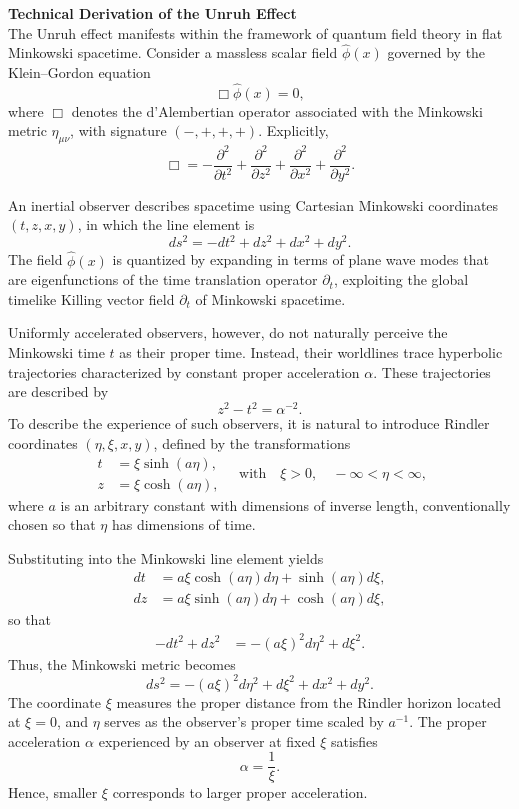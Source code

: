 \begin{technical}
{\Large\textbf{Technical Derivation of the Unruh Effect}}\\[0.7em]

The Unruh effect manifests within the framework of quantum field theory in flat Minkowski spacetime. Consider a massless scalar field $\hat{\phi}(x)$ governed by the Klein--Gordon equation
\[
\Box \hat{\phi}(x) = 0,
\]
where $\Box$ denotes the d'Alembertian operator associated with the Minkowski metric $\eta_{\mu\nu}$, with signature $(-,+,+,+)$. Explicitly,
\[
\Box = -\frac{\partial^2}{\partial t^2} + \frac{\partial^2}{\partial z^2} + \frac{\partial^2}{\partial x^2} + \frac{\partial^2}{\partial y^2}.
\]

An inertial observer describes spacetime using Cartesian Minkowski coordinates $(t, z, x, y)$, in which the line element is
\[
ds^2 = -dt^2 + dz^2 + dx^2 + dy^2.
\]
The field $\hat{\phi}(x)$ is quantized by expanding in terms of plane wave modes that are eigenfunctions of the time translation operator $\partial_t$, exploiting the global timelike Killing vector field $\partial_t$ of Minkowski spacetime.

Uniformly accelerated observers, however, do not naturally perceive the Minkowski time $t$ as their proper time. Instead, their worldlines trace hyperbolic trajectories characterized by constant proper acceleration $\alpha$. These trajectories are described by
\[
z^2 - t^2 = \alpha^{-2}.
\]
To describe the experience of such observers, it is natural to introduce Rindler coordinates $(\eta, \xi, x, y)$, defined by the transformations
\[
\begin{aligned}
t &= \xi \sinh(a\eta), \\
z &= \xi \cosh(a\eta),
\end{aligned}
\quad \text{with} \quad \xi > 0, \quad -\infty < \eta < \infty,
\]
where $a$ is an arbitrary constant with dimensions of inverse length, conventionally chosen so that $\eta$ has dimensions of time. 

Substituting into the Minkowski line element yields
\[
\begin{aligned}
dt &= a \xi \cosh(a\eta) d\eta + \sinh(a\eta) d\xi, \\
dz &= a \xi \sinh(a\eta) d\eta + \cosh(a\eta) d\xi,
\end{aligned}
\]
so that
\[
\begin{aligned}
-dt^2 + dz^2 &= -(a\xi)^2 d\eta^2 + d\xi^2.
\end{aligned}
\]
Thus, the Minkowski metric becomes
\[
ds^2 = - (a\xi)^2 d\eta^2 + d\xi^2 + dx^2 + dy^2.
\]
The coordinate $\xi$ measures the proper distance from the Rindler horizon located at $\xi = 0$, and $\eta$ serves as the observer's proper time scaled by $a^{-1}$. The proper acceleration $\alpha$ experienced by an observer at fixed $\xi$ satisfies
\[
\alpha = \frac{1}{\xi}.
\]
Hence, smaller $\xi$ corresponds to larger proper acceleration.


\end{technical}
